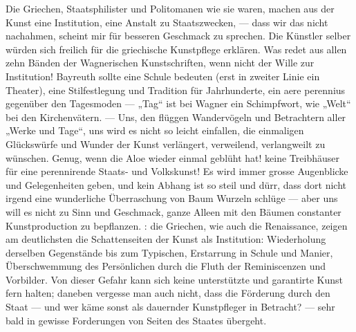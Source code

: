 Die Griechen, Staatsphilister und Politomanen wie sie waren, machen aus der Kunst eine Institution, eine Anstalt zu Staatszwecken, — dass wir das nicht nachahmen, scheint mir für  besseren Geschmack zu sprechen. Die Künstler selber würden sich freilich für die griechische Kunstpflege erklären. Was redet aus allen zehn Bänden der Wagnerischen Kunstschriften, wenn nicht der Wille zur Institution! Bayreuth sollte eine Schule bedeuten (erst in zweiter Linie ein Theater), eine Stilfestlegung und Tradition für Jahrhunderte, ein aere perennius gegenüber den Tagesmoden — „Tag“ ist bei Wagner ein Schimpfwort, wie „Welt“ bei den Kirchenvätern. — Uns, den flüggen Wandervögeln und Betrachtern aller „Werke und Tage“, uns wird es nicht so leicht einfallen, die einmaligen Glückswürfe und Wunder der Kunst verlängert, verweilend, verlangweilt zu wünschen. Genug, wenn die Aloe wieder einmal geblüht hat! keine Treibhäuser für eine perennirende Staats- und Volkskunst! Es wird immer grosse Augenblicke und Gelegenheiten geben, und kein Abhang ist so steil und dürr, dass dort nicht irgend eine wunderliche Überraschung von Baum Wurzeln schlüge — aber uns will es nicht zu Sinn und Geschmack, ganze Alleen mit den Bäumen constanter Kunstproduction zu bepflanzen.     : die Griechen, wie auch die Renaissance, zeigen am deutlichsten die Schattenseiten der Kunst als Institution: Wiederholung derselben Gegenstände bis zum Typischen, Erstarrung in Schule und Manier, Überschwemmung des Persönlichen durch die Fluth der Reminiscenzen und Vorbilder. Von dieser Gefahr kann sich keine unterstützte und garantirte Kunst fern halten; daneben vergesse man auch nicht, dass die Förderung durch den Staat — und wer käme sonst als dauernder Kunstpfleger in Betracht? — sehr bald in gewisse Forderungen von Seiten des Staates übergeht.
\par

